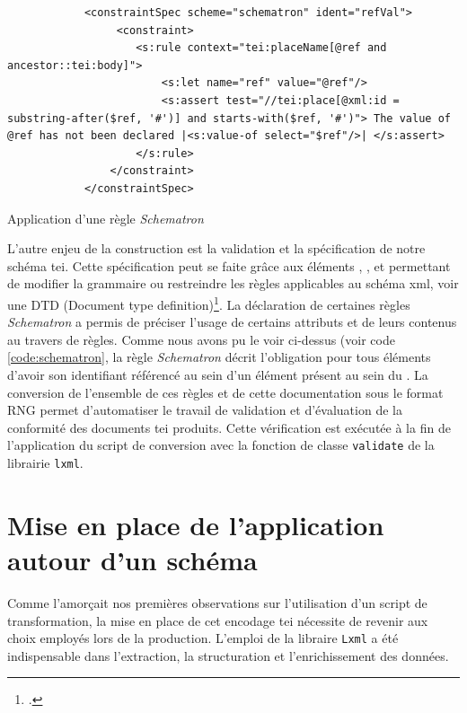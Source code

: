 	\begin{listing}
	        \begin{verbatim}
            <constraintSpec scheme="schematron" ident="refVal">
                 <constraint>
                    <s:rule context="tei:placeName[@ref and ancestor::tei:body]">
                        <s:let name="ref" value="@ref"/>
                        <s:assert test="//tei:place[@xml:id = substring-after($ref, '#')] and starts-with($ref, '#')"> The value of @ref has not been declared |<s:value-of select="$ref"/>| </s:assert>
                    </s:rule>
                </constraint>
            </constraintSpec>
            \end{verbatim}
        	\caption{Application d'une règle \textit{Schematron}}
        	\label{code:schematron}
    \end{listing}
	
	
	
	L'autre enjeu de la construction est la validation et la spécification de notre schéma \gls{tei}. Cette spécification peut se faite grâce aux éléments , , et  permettant de modifier la grammaire ou restreindre les règles applicables au schéma \gls{xml}, voir une DTD (Document type definition)\footcite{burnardQuEstceQue2015}. La déclaration de certaines règles \textit{Schematron} a permis de préciser l'usage de certains attributs et de leurs contenus au travers de règles. Comme nous avons pu le voir ci-dessus (voir code \ref{code:schematron}, la règle \textit{Schematron} décrit l'obligation pour tous éléments  d'avoir son identifiant référencé au sein d'un élément  présent au sein du . La conversion de l'ensemble de ces règles et de cette documentation sous le format \gls{RNG} permet d'automatiser le travail de validation et d'évaluation de la conformité des documents \gls{tei} produits. Cette vérification est exécutée à la fin de l'application du script de conversion avec la fonction de classe \texttt{validate} de la librairie \texttt{lxml}.
	
	\section{Mise en place de l'application autour d'un schéma}
	
	Comme l'amorçait nos premières observations sur l'utilisation d'un script de transformation, la mise en place de cet encodage \gls{tei} nécessite de revenir aux choix employés lors de la production. L'emploi de la libraire \texttt{Lxml} a été indispensable dans l'extraction, la structuration et l'enrichissement des données. 
	
